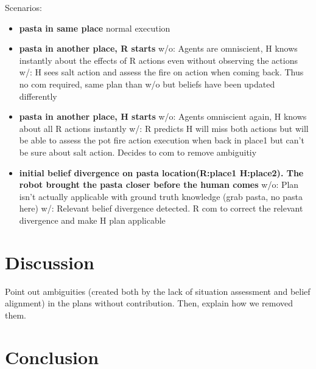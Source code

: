 \documentclass[letterpaper]{article} %
\begin{document}
Scenarios:
\begin{itemize}
    \item \textbf{pasta in same place}
        \subitem normal execution
    
    \item \textbf{pasta in another place, R starts}
        \subitem w/o: Agents are omniscient, H knows instantly about the effects of R actions even without observing the actions
        \subitem w/: H sees salt action and assess the fire on action when coming back. Thus no com required, same plan than w/o but beliefs have been updated differently
        
    \item \textbf{pasta in another place, H starts}
        \subitem w/o: Agents omniscient again, H knows about all R actions instantly
        \subitem w/: R predicts H will miss both actions but will be able to assess the pot fire action execution when back in place1 but can't be sure about salt action. Decides to com to remove ambiguitiy
    
    \item \textbf{initial belief divergence on pasta location(R:place1 H:place2). The robot brought the pasta closer before the human comes}
        \subitem w/o: Plan isn't actually applicable with ground truth knowledge (grab pasta, no pasta here)
        \subitem w/: Relevant belief divergence detected. R com to correct the relevant divergence and make H plan applicable
    
    
\end{itemize}

\section{Discussion}

Point out ambiguities (created both by the lack of situation assessment and belief alignment) in the plans without contribution. Then, explain how we removed them. 

\section{Conclusion}


\end{document}
